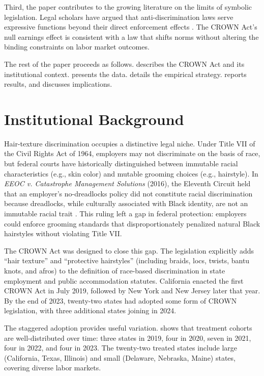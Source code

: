 \documentclass[12pt]{article}
\begin{document}
Third, the paper contributes to the growing literature on the limits of symbolic legislation. Legal scholars have argued that anti-discrimination laws serve expressive functions beyond their direct enforcement effects \citep{sunstein_1996}. The CROWN Act's null earnings effect is consistent with a law that shifts norms without altering the binding constraints on labor market outcomes.

The rest of the paper proceeds as follows.  describes the CROWN Act and its institutional context.  presents the data.  details the empirical strategy.  reports results, and  discusses implications.


\section{Institutional Background}
\label{sec:background}

Hair-texture discrimination occupies a distinctive legal niche. Under Title VII of the Civil Rights Act of 1964, employers may not discriminate on the basis of race, but federal courts have historically distinguished between immutable racial characteristics (e.g., skin color) and mutable grooming choices (e.g., hairstyle). In \textit{EEOC v. Catastrophe Management Solutions} (2016), the Eleventh Circuit held that an employer's no-dreadlocks policy did not constitute racial discrimination because dreadlocks, while culturally associated with Black identity, are not an immutable racial trait \citep{eeoc_catastrophe_2016}. This ruling left a gap in federal protection: employers could enforce grooming standards that disproportionately penalized natural Black hairstyles without violating Title VII.

The CROWN Act was designed to close this gap. The legislation explicitly adds ``hair texture'' and ``protective hairstyles'' (including braids, locs, twists, bantu knots, and afros) to the definition of race-based discrimination in state employment and public accommodation statutes. California enacted the first CROWN Act in July 2019, followed by New York and New Jersey later that year. By the end of 2023, twenty-two states had adopted some form of CROWN legislation, with three additional states joining in 2024.

The staggered adoption provides useful variation.  shows that treatment cohorts are well-distributed over time: three states in 2019, four in 2020, seven in 2021, four in 2022, and four in 2023. The twenty-two treated states include large (California, Texas, Illinois) and small (Delaware, Nebraska, Maine) states, covering diverse labor markets.
\end{document}
